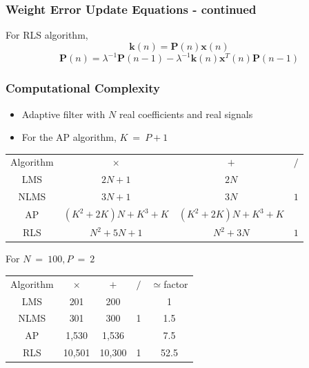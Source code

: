 \documentclass[12pt,hyperref=true,mathserif]{beamer}
\begin{document}
\begin{frame}
\frametitle{Weight Error Update Equations - continued}
For RLS algorithm,
\begin{equation}%
  \mathbf{k}(n)=\mathbf{P}(n)\mathbf{x}(n)
\end{equation}
\begin{equation}\label{equ:RecursiveWeightUpdate}
  \mathbf{P}(n)=\lambda^{-1}\mathbf{P}(n-1)-\lambda^{-1}\mathbf{k}(n)\mathbf{x}^{T}(n)\mathbf{P}(n-1)
\end{equation}
\end{frame}

\begin{frame}[fragile]
\frametitle{Computational Complexity}
\begin{itemize}
  \item Adaptive filter with $N$ real coefficients and real signals
  \item For the AP algorithm, $K~=~P+1$
\end{itemize}
\begin{tabular}{|c|c|c|c|}

  \hline
  Algorithm & $\times$ & $+$ & $/$ \\
  LMS & $2N+1$ & $2N$ &  \\
  NLMS & $3N+1$ & $3N$ & $1$ \\
  AP & $(K^{2}+2K)N+K^{3}+K$ & $(K^{2}+2K)N+K^{3}+K$ &  \\
  RLS & $N^{2}+5N+1$ & $N^{2}+3N$ & $1$ \\
  \hline
\end{tabular}
For $N~=~100,P~=~2$
\begin{tabular}{|c|c|c|c|c|}
  \hline
  Algorithm & $\times$ & $+$ & $/$ & $\simeq$factor \\
  LMS & 201 & 200 &  & 1 \\
  NLMS & 301 & 300 & 1 & 1.5 \\
  AP & 1,530 & 1,536 &  & 7.5 \\
  RLS & 10,501 & 10,300 & 1 & 52.5 \\
  \hline
\end{tabular}
\end{frame}
\end{document}
